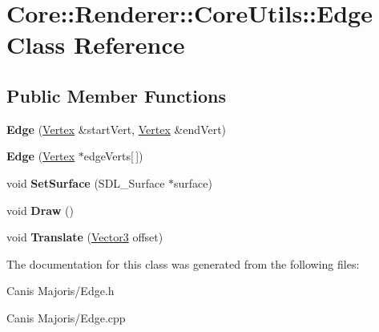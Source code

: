 \hypertarget{class_core_1_1_renderer_1_1_core_utils_1_1_edge}{\section{Core\+:\+:Renderer\+:\+:Core\+Utils\+:\+:Edge Class Reference}
\label{class_core_1_1_renderer_1_1_core_utils_1_1_edge}
}
\subsection*{Public Member Functions}
\begin{DoxyCompactItemize}
\item 
\hypertarget{class_core_1_1_renderer_1_1_core_utils_1_1_edge_aba15a616e4f1a4721c277d8b28fd6a57}{{\bfseries Edge} (\hyperlink{class_core_1_1_renderer_1_1_core_utils_1_1_vertex}{Vertex} \&start\+Vert, \hyperlink{class_core_1_1_renderer_1_1_core_utils_1_1_vertex}{Vertex} \&end\+Vert)}\label{class_core_1_1_renderer_1_1_core_utils_1_1_edge_aba15a616e4f1a4721c277d8b28fd6a57}

\item 
\hypertarget{class_core_1_1_renderer_1_1_core_utils_1_1_edge_acc745dd18d79cadb1a97c3828ade4ae1}{{\bfseries Edge} (\hyperlink{class_core_1_1_renderer_1_1_core_utils_1_1_vertex}{Vertex} $\ast$edge\+Verts\mbox{[}$\,$\mbox{]})}\label{class_core_1_1_renderer_1_1_core_utils_1_1_edge_acc745dd18d79cadb1a97c3828ade4ae1}

\item 
\hypertarget{class_core_1_1_renderer_1_1_core_utils_1_1_edge_a453de9afb389e5a52f6bbb6295a3b160}{void {\bfseries Set\+Surface} (S\+D\+L\+\_\+\+Surface $\ast$surface)}\label{class_core_1_1_renderer_1_1_core_utils_1_1_edge_a453de9afb389e5a52f6bbb6295a3b160}

\item 
\hypertarget{class_core_1_1_renderer_1_1_core_utils_1_1_edge_aa410e62888fd805a045dbf1cbef50fe5}{void {\bfseries Draw} ()}\label{class_core_1_1_renderer_1_1_core_utils_1_1_edge_aa410e62888fd805a045dbf1cbef50fe5}

\item 
\hypertarget{class_core_1_1_renderer_1_1_core_utils_1_1_edge_aac32caa25526a6997d56667778661269}{void {\bfseries Translate} (\hyperlink{class_vector3}{Vector3} offset)}\label{class_core_1_1_renderer_1_1_core_utils_1_1_edge_aac32caa25526a6997d56667778661269}

\end{DoxyCompactItemize}


The documentation for this class was generated from the following files\+:\begin{DoxyCompactItemize}
\item 
Canis Majoris/Edge.\+h\item 
Canis Majoris/Edge.\+cpp\end{DoxyCompactItemize}
